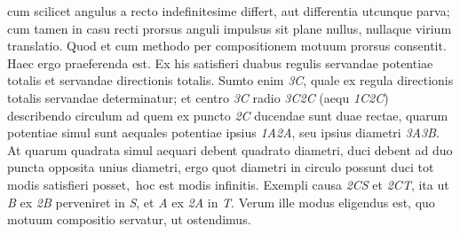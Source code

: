 \protect{} cum scilicet angulus a recto indefinitesime differt, aut differentia utcunque parva;%
\protect{} cum tamen in casu recti prorsus anguli impulsus sit plane nullus,%
\protect{} nullaque virium translatio\protect{}. Quod et cum methodo per compositionem motuum%
\protect{} prorsus consentit. Haec ergo praeferenda est. Ex his  
%
 satisfieri duabus regulis servandae potentiae totalis%
\protect{}%
\protect{} et servandae directionis totalis.%
\protect{}%
\protect{} Sumto enim \textit{{\scriptsize3}C}, quale ex regula directionis totalis servandae\protect{} determinatur; et centro \textit{{\scriptsize3}C} radio \textit{{\scriptsize3}C{\scriptsize2}C} (aequ \textit{{\scriptsize1}C{\scriptsize2}C}) describendo circulum ad quem ex puncto \textit{{\scriptsize2}C} ducendae sunt duae rectae, quarum potentiae%
\protect{} simul sunt aequales potentiae%
\protect{} ipsius \textit{{\scriptsize1}A{\scriptsize2}A}, seu ipsius diametri \textit{{\scriptsize3}A{\scriptsize3}B}. At  
%
%
 quarum quadrata simul aequari debent quadrato diametri, duci debent ad duo puncta opposita unius diametri, ergo quot diametri in circulo possunt duci tot modis satisfieri posset\lbrack,\rbrack\ hoc est modis infinitis. Exempli causa \textit{{\scriptsize2}CS} et \textit{{\scriptsize2}CT}, ita ut \textit{B} ex \textit{{\scriptsize2}B} perveniret in \textit{S}, et \textit{A} ex \textit{{\scriptsize2}A} in \textit{T}. Verum ille modus eligendus est, quo motuum compositio%
\protect{} servatur, ut ostendimus.%

